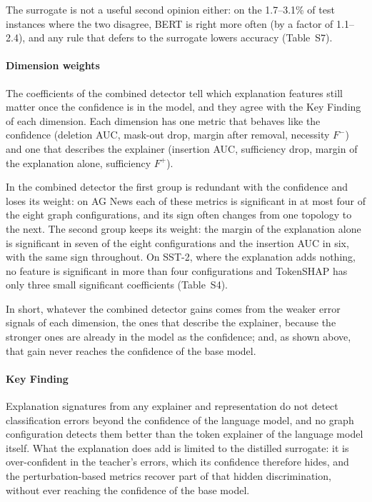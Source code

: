 \documentclass[preprint, times, review, 10pt]{elsarticle}
\begin{document}
The surrogate is not a useful second opinion either: on the 1.7--3.1\% of test instances where the two disagree, BERT is right more often (by a factor of 1.1--2.4), and any rule that defers to the surrogate lowers accuracy (Table~S7).

\paragraph{Dimension weights}
The coefficients of the combined detector tell which explanation features still matter once the confidence is in the model, and they agree with the Key Finding of each dimension. Each dimension has one metric that behaves like the confidence (deletion AUC, mask-out drop, margin after removal, necessity \(F^{-}\)) and one that describes the explainer (insertion AUC, sufficiency drop, margin of the explanation alone, sufficiency \(F^{+}\)).

In the combined detector the first group is redundant with the confidence and loses its weight: on AG News each of these metrics is significant in at most four of the eight graph configurations, and its sign often changes from one topology to the next. The second group keeps its weight: the margin of the explanation alone is significant in seven of the eight configurations and the insertion AUC in six, with the same sign throughout. On SST-2, where the explanation adds nothing, no feature is significant in more than four configurations and TokenSHAP has only three small significant coefficients (Table~S4).

In short, whatever the combined detector gains comes from the weaker error signals of each dimension, the ones that describe the explainer, because the stronger ones are already in the model as the confidence; and, as shown above, that gain never reaches the confidence of the base model.

\paragraph{\textbf{Key Finding}}
Explanation signatures from any explainer and representation do not detect classification errors beyond the confidence of the language model, and no graph configuration detects them better than the token explainer of the language model itself. What the explanation does add is limited to the distilled surrogate: it is over-confident in the teacher's errors, which its confidence therefore hides, and the perturbation-based metrics recover part of that hidden discrimination, without ever reaching the confidence of the base model.
\end{document}
